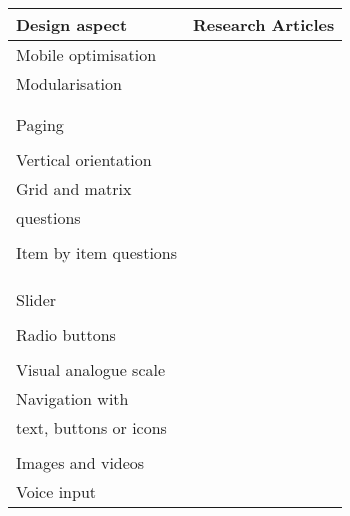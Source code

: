 \begin{table}
	\centering
	\begin{tabular}{ll}
		\toprule
		Design aspect  &  Research Articles \\
		\midrule
		Mobile optimisation & \cite{arn_evaluation_2015, revilla_open_2016}\\
		Modularisation & \cite{antoun_design_2018, callegaro_mixed-mode_2013}\\
    	& \cite{toepoel_modularization_2018, bansal_shorter_2017}\\
    	& \cite{mason_effect_2019}\\
    	Paging & \cite{de_bruijne_improving_2014}\\
    	& \cite{mavletova_mobile_2014}\\
        Vertical orientation & \cite{de_bruijne_improving_2014}\\
        Grid and matrix & \cite{revilla_experiment_2017, mavletova_grid_2018}\\
    	questions & \cite{revilla_comparing_2018, revilla_testing_2018}\\
    	& \cite{tourangeau_web_2017}\\
        Item by item questions & \cite{revilla_experiment_2017, revilla_comparing_2018}\\
    	& \cite{mavletova_grid_2018}\\
    	& \cite{revilla_testing_2018}\\
    	& \cite{tourangeau_web_2017, grady_what_2019}\\
        Slider & \cite{antoun_effects_2017, maineri_slider_2021}\\
    	& \cite{toepoel_sliders_2018}\\
        Radio buttons & \cite{olmsted-hawala_optimal_2018}\\
    	& \cite{ cernat_radio_2019}\\
        Visual analogue scale & \cite{toepoel_sliders_2018}\\
        Navigation with & \cite{revilla_comparing_2018}\\
    	text, buttons or icons & \cite{ olmsted-hawala_optimal_2018}\\
         & \cite{lugtig_recruiting_2019, revilla_testing_2018}\\
        Images and videos & \cite{mendelson_displaying_2017, trubner_effects_2020}\\
    	Voice input & \cite{revilla_improving_2021, revilla_testing_2020}\\

\end{tabular}
\end{table}
